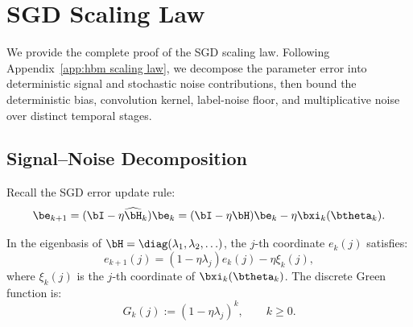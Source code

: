 




\newpage
\section{SGD Scaling Law}
\label{app:sgd_scaling_law}

We provide the complete proof of the SGD scaling law. Following Appendix~\ref{app:hbm scaling law}, we decompose the parameter error into deterministic signal and stochastic noise contributions, then bound the deterministic bias, convolution kernel, label-noise floor, and multiplicative noise over distinct temporal stages.

\subsection{Signal--Noise Decomposition} 
\label{app:sgd_signal_noise_decomp}

Recall the SGD error update rule:
\[
    \be_{k+1}
    =
    (\bI - \eta \widehat{\bH}_k)\be_k
    =
    (\bI - \eta \bH)\be_k - \eta \bxi_k(\btheta_k).
\]

In the eigenbasis of $\bH = \diag(\lambda_1,\lambda_2,\ldots)$, the $j$-th coordinate $e_k(j)$ satisfies:
\[
    e_{k+1}(j)
    =
    (1-\eta\lambda_j)e_k(j) - \eta\xi_k(j),
\]
where $\xi_k(j)$ is the $j$-th coordinate of $\bxi_k(\btheta_k)$. The discrete Green function is:
\[
    G_k(j) := (1-\eta\lambda_j)^k, \qquad k \ge 0.
\]

